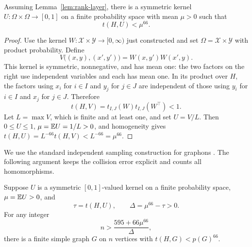 \begin{proposition}
\label{prop:negative-kernel}
Assuming Lemma~\ref{lem:rank-layer}, there is a symmetric kernel
$U:\Omega\times\Omega\to[0,1]$ on a finite probability space with
mean $\mu>0$ such that
\begin{equation}
 t(H,U)<\mu^{66}.
 \label{eq:kernel-symmetric-gap}
\end{equation}
\end{proposition}

\begin{proof}
Use the kernel $W:\mathcal X\times\mathcal Y\to[0,\infty)$ just
constructed and set $\Omega=\mathcal X\times\mathcal Y$ with product
probability. Define
\begin{equation}
 V\bigl((x,y),(x',y')\bigr)=W(x,y')W(x',y).
 \label{eq:kernel-crossed-product}
\end{equation}
This kernel is symmetric, nonnegative, and has mean one: the two
factors on the right use independent variables and each has mean
one. In its product over $H$, the factors using $x_i$ for $i\in I$
and $y_j$ for $j\in J$ are independent of those using $y_i$ for
$i\in I$ and $x_j$ for $j\in J$. Therefore
\[
 t(H,V)=t_{I,J}(W)t_{I,J}(W^\top)<1.
\]
Let $L=\max V$, which is finite and at least one, and set $U=V/L$.
Then $0\le U\le1$, $\mu=\mathbb E U=1/L>0$, and homogeneity gives
$t(H,U)=L^{-66}t(H,V)<L^{-66}=\mu^{66}$.
\end{proof}

We use the standard independent sampling construction for graphons
\cite[Section~2.6, Lemma~2.4]{lovaszszegedy2006}. The following argument keeps the collision
error explicit and counts all homomorphisms.

\begin{lemma}
\label{lem:finite-host}
Suppose $U$ is a symmetric $[0,1]$-valued kernel on a finite
probability space, $\mu=\mathbb E U>0$, and
\[
 \tau=t(H,U),\qquad \Delta=\mu^{66}-\tau>0.
\]
For any integer
\begin{equation}
 n>\frac{595+66\mu^{66}}{\Delta},
 \label{eq:kernel-host-size}
\end{equation}
there is a finite simple graph $G$ on $n$ vertices with
$t(H,G)<p(G)^{66}$.
\end{lemma}

